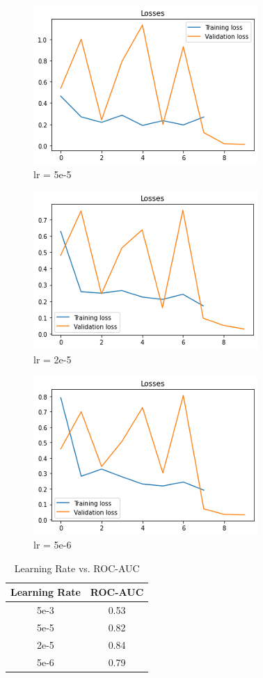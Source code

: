 \documentclass[11pt,a4paper]{article}
\begin{document}
\begin{figure}[!htbp]
	\centering
	\includegraphics{figures/figure7.png}
	\caption{\label{fig:my-label}  lr = 5e-5}
\end{figure}

\begin{figure}[!htbp]
	\centering
	\includegraphics{figures/figure8.png}
	\caption{\label{fig:my-label}  lr = 2e-5}
\end{figure}

\begin{figure}[!htbp]
	\centering
	\includegraphics{figures/figure9.png}
	\caption{\label{fig:my-label} lr = 5e-6}
\end{figure}

\begin{table}[!htbp]
	\centering
	\begin{tabular}{|c|c|}
		\hline
		{Learning Rate} & {ROC-AUC} \\ \hline
		5e-3                   & 0.53             \\ \hline
		5e-5                   & 0.82             \\ \hline
		2e-5                   & 0.84             \\ \hline
		5e-6                   & 0.79             \\ \hline
	\end{tabular}
	\caption{\label{table:my-label} Learning Rate vs. ROC-AUC}
\end{table}
\end{document}
